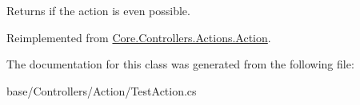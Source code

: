 Returns if the action is even possible. 



Reimplemented from \hyperlink{classCore_1_1Controllers_1_1Actions_1_1Action_a405b995343a9394ad19e05a699a4e6d9}{Core.\-Controllers.\-Actions.\-Action}.



The documentation for this class was generated from the following file\-:\begin{DoxyCompactItemize}
\item 
base/\-Controllers/\-Action/Test\-Action.\-cs\end{DoxyCompactItemize}
